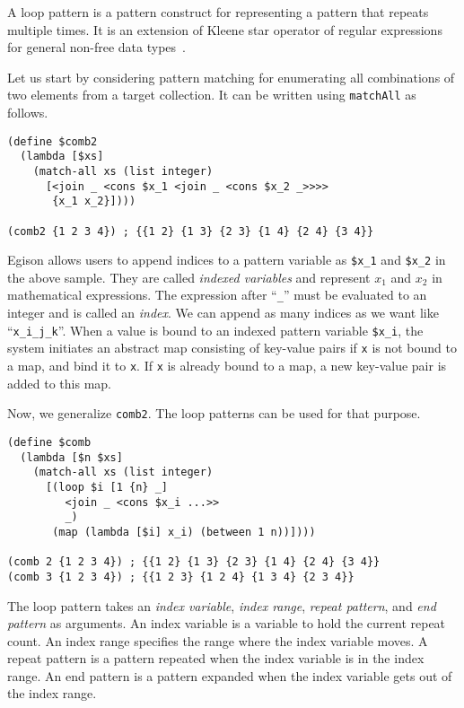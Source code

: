 \documentclass{article}
\begin{document}
A loop pattern is a pattern construct for representing a pattern that repeats multiple times.
It is an extension of Kleene star operator of regular expressions for general non-free data types~\cite{egi2018loop}.

Let us start by considering pattern matching for enumerating all combinations of two elements from a target collection.
It can be written using \texttt{matchAll} as follows.

\begin{lstlisting}[language=egison]
(define $comb2
  (lambda [$xs]
    (match-all xs (list integer)
      [<join _ <cons $x_1 <join _ <cons $x_2 _>>>>
       {x_1 x_2}])))

(comb2 {1 2 3 4}) ; {{1 2} {1 3} {2 3} {1 4} {2 4} {3 4}}
\end{lstlisting}

Egison allows users to append indices to a pattern variable as \verb|$x_1| and \verb|$x_2| in the above sample.
They are called \emph{indexed variables} and represent $x_1$ and $x_2$ in mathematical expressions.
The expression after ``\verb|_|'' must be evaluated to an integer and is called an \textit{index}.
We can append as many indices as we want like ``\verb|x_i_j_k|''.
When a value is bound to an indexed pattern variable \verb|$x_i|, the system initiates an abstract map consisting of key-value pairs if \verb|x| is not bound to a map, and bind it to \texttt{x}.
If \verb|x| is already bound to a map, a new key-value pair is added to this map.

Now, we generalize \texttt{comb2}.
The loop patterns can be used for that purpose.

\begin{lstlisting}[language=egison]
(define $comb
  (lambda [$n $xs]
    (match-all xs (list integer)
      [(loop $i [1 {n} _]
         <join _ <cons $x_i ...>>
         _)
       (map (lambda [$i] x_i) (between 1 n))])))

(comb 2 {1 2 3 4}) ; {{1 2} {1 3} {2 3} {1 4} {2 4} {3 4}}
(comb 3 {1 2 3 4}) ; {{1 2 3} {1 2 4} {1 3 4} {2 3 4}}
\end{lstlisting}

The loop pattern takes an \emph{index variable}, \emph{index range}, \emph{repeat pattern}, and \emph{end pattern} as arguments.
An index variable is a variable to hold the current repeat count.
An index range specifies the range where the index variable moves.
A repeat pattern is a pattern repeated when the index variable is in the index range.
An end pattern is a pattern expanded when the index variable gets out of the index range.
\end{document}
